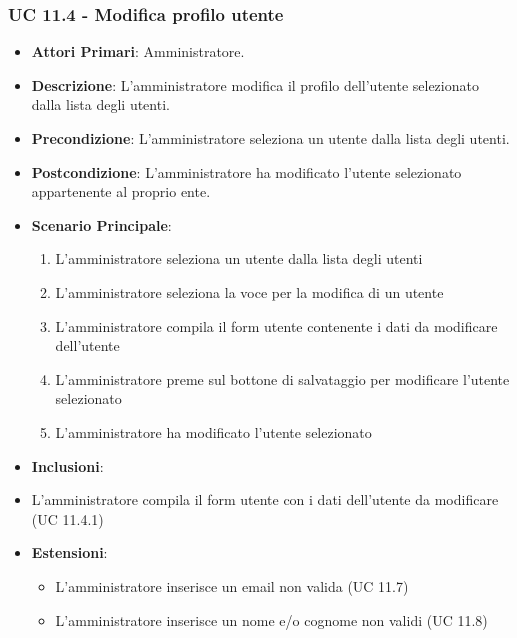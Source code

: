 			\subsubsection{UC 11.4 - Modifica profilo utente}
			\begin{itemize}
				\item \textbf{Attori Primari}: Amministratore.
				\item \textbf{Descrizione}: L'amministratore modifica il profilo dell'utente selezionato dalla lista degli utenti.
				\item \textbf{Precondizione}: L'amministratore seleziona un utente dalla lista degli utenti.
				\item \textbf{Postcondizione}: L'amministratore ha modificato l'utente selezionato appartenente al proprio ente.
				\item \textbf{Scenario Principale}:
				\begin{enumerate}
					\item{L'amministratore seleziona un utente dalla lista degli utenti}
					\item{L'amministratore seleziona la voce per la modifica di un utente}
					\item{L'amministratore compila il form utente contenente i dati da modificare dell'utente}
					\item{L'amministratore preme sul bottone di salvataggio per modificare l'utente selezionato}
					\item{L'amministratore ha modificato l'utente selezionato}
				\end{enumerate}	
				\item \textbf{Inclusioni}:
					\item L'amministratore compila il form utente con i dati dell'utente da modificare (UC 11.4.1)
				\item \textbf{Estensioni}:
				\begin{itemize}
					\item L'amministratore inserisce un email non valida (UC 11.7)
					\item L'amministratore inserisce un nome e/o cognome non validi (UC 11.8)
				\end{itemize}
			\end{itemize}

